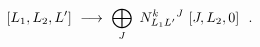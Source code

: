 \begin{equation}\label{mmADflowI}
[L_{1},L_{2},L']\ \longrightarrow\ \makebox[6cm][l]{$
\displaystyle \bigoplus_{J}\ N^{k}_{L_{1}L'}{}^{J}\ [J,L_{2},0] \ \ .$}
\end{equation}


